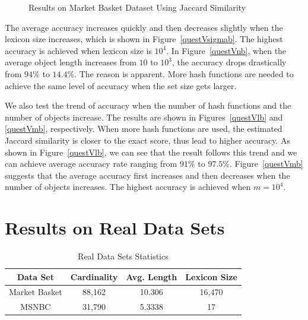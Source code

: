 \begin{figure}[htb]
{\label{mbdsVkAcc}}
\quad
\raggedright
{}
\caption{Results on Market Basket Dataset Using Jaccard Similarity}
\label{mbData}
\end{figure}


The average accuracy increases quickly and then decreases slightly when the lexicon size increases, which is shown in Figure~\ref{questVsigmab}.  The highest accuracy is achieved when lexicon size is $10^4$.  In Figure~\ref{questVnb}, when the average object length increases from $10$ to $10^3$, the accuracy drops drastically from $94\%$ to $14.4\%$.  The reason is apparent.  More hash functions are needed to achieve the same level of accuracy when the set size gets larger. 

We also test the trend of accuracy when the number of hash functions and the number of objects increase.  The results are shown in Figures~\ref{questVlb} and \ref{questVmb}, respectively.  When more hash functions are used, the estimated Jaccard similarity is closer to the exact score, thus lead to higher accuracy.  As shown in Figure~\ref{questVlb}, we can see that the result follows this trend and we can achieve average accuracy rate ranging from $91\%$ to $97.5\%$.  Figure~\ref{questVmb} suggests that the average accuracy first increases and then decreases when the number of objects increases. The highest accuracy is achieved when $m = 10^4$.  

\section{Results on Real Data Sets}
\label{sec:real-data}

\begin {table}[t]
\caption {Real Data Sets Statistics}  
\label{datasetStat} 
\begin{center}%
{
    \begin{tabular}{ |c|c|c|c|}
    \hline
    Data Set  & Cardinality & Avg. Length & Lexicon Size \\ \hline
    Market Basket & 88,162 & 10.306 & 16,470 \\ \hline
    MSNBC & 31,790 & 5.3338 & 17 \\ \hline
    \end{tabular}}
\end{center}
\end {table}

